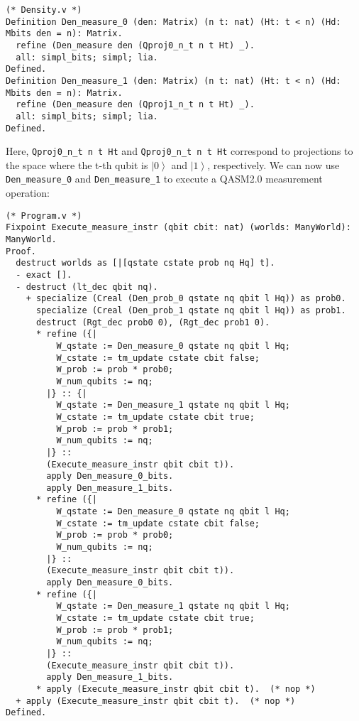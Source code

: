 \documentclass[10pt,a4paper]{article}
\newcommand{\<}{\langle}
\renewcommand{\>}{\rangle}
\newcommand{\ket}[1]{\left\vert #1 \right\>}
\begin{document}
\begin{lstlisting}
(* Density.v *)
Definition Den_measure_0 (den: Matrix) (n t: nat) (Ht: t < n) (Hd: Mbits den = n): Matrix.
  refine (Den_measure den (Qproj0_n_t n t Ht) _).
  all: simpl_bits; simpl; lia.
Defined.
Definition Den_measure_1 (den: Matrix) (n t: nat) (Ht: t < n) (Hd: Mbits den = n): Matrix.
  refine (Den_measure den (Qproj1_n_t n t Ht) _).
  all: simpl_bits; simpl; lia.
Defined.
\end{lstlisting}

Here, \texttt{Qproj0\_n\_t n t Ht} and \texttt{Qproj0\_n\_t n t Ht} correspond to
projections to the space where the t-th qubit is $\ket{0}$ and $\ket{1}$, respectively.
We can now use \texttt{Den\_measure\_0} and \texttt{Den\_measure\_1} to
execute a QASM2.0 measurement operation:

\begin{lstlisting}
(* Program.v *)
Fixpoint Execute_measure_instr (qbit cbit: nat) (worlds: ManyWorld): ManyWorld.
Proof.
  destruct worlds as [|[qstate cstate prob nq Hq] t].
  - exact [].
  - destruct (lt_dec qbit nq).
    + specialize (Creal (Den_prob_0 qstate nq qbit l Hq)) as prob0.
      specialize (Creal (Den_prob_1 qstate nq qbit l Hq)) as prob1.
      destruct (Rgt_dec prob0 0), (Rgt_dec prob1 0).
      * refine ({|
          W_qstate := Den_measure_0 qstate nq qbit l Hq;
          W_cstate := tm_update cstate cbit false;
          W_prob := prob * prob0;
          W_num_qubits := nq;
        |} :: {|
          W_qstate := Den_measure_1 qstate nq qbit l Hq;
          W_cstate := tm_update cstate cbit true;
          W_prob := prob * prob1;
          W_num_qubits := nq;
        |} ::
        (Execute_measure_instr qbit cbit t)).
        apply Den_measure_0_bits.
        apply Den_measure_1_bits.
      * refine ({|
          W_qstate := Den_measure_0 qstate nq qbit l Hq;
          W_cstate := tm_update cstate cbit false;
          W_prob := prob * prob0;
          W_num_qubits := nq;
        |} ::
        (Execute_measure_instr qbit cbit t)).
        apply Den_measure_0_bits.
      * refine ({|
          W_qstate := Den_measure_1 qstate nq qbit l Hq;
          W_cstate := tm_update cstate cbit true;
          W_prob := prob * prob1;
          W_num_qubits := nq;
        |} ::
        (Execute_measure_instr qbit cbit t)).
        apply Den_measure_1_bits.
      * apply (Execute_measure_instr qbit cbit t).  (* nop *)
  + apply (Execute_measure_instr qbit cbit t).  (* nop *)
Defined.
\end{lstlisting}
\end{document}
